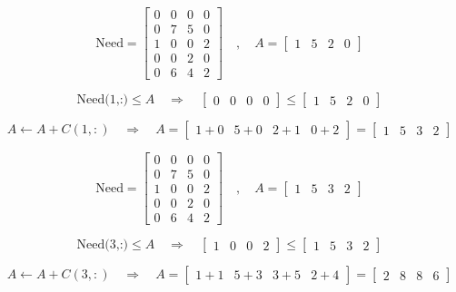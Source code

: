 \[\text{Need} = \left[\begin{matrix} 0 & 0 & 0 & 0 \\
                             0 & 7 & 5 & 0\\
                             1 & 0 & 0 & 2\\
                             0 & 0 & 2 & 0\\
                     0 & 6 & 4 & 2\end{matrix}\right]\quad,\quad
A =\left[\begin{matrix} 1 & 5  & 2 & 0   \end{matrix}\right] 
\]

\[ \text{Need(1,:)} \leq A \quad \Longrightarrow \quad
\left[\begin{matrix} 0 & 0  & 0 & 0   \end{matrix}\right] \leq
 \left[\begin{matrix} 1 & 5  & 2 & 0   \end{matrix}\right] \]

\[A \gets A + C(1,:)\quad \Longrightarrow \quad A = \left[\begin{matrix} 1+0 & 5+0  & 2+1 & 0+2  \end{matrix}\right] = 
 \left[\begin{matrix} 1 & 5  & 3 & 2  \end{matrix}\right]\]

\vspace{0.5cm}
\[\text{Need} = \left[\begin{matrix} 0 & 0 & 0 & 0 \\
                             0 & 7 & 5 & 0\\
                             1 & 0 & 0 & 2\\
                             0 & 0 & 2 & 0\\
                     0 & 6 & 4 & 2\end{matrix}\right]\quad,\quad
A =\left[\begin{matrix} 1 & 5  & 3 & 2   \end{matrix}\right] 
\]

\[ \text{Need(3,:)} \leq A \quad \Longrightarrow \quad
\left[\begin{matrix} 1 & 0  & 0 & 2   \end{matrix}\right] \leq
 \left[\begin{matrix} 1 & 5  & 3 & 2   \end{matrix}\right] \]

\[A \gets A + C(3,:)\quad \Longrightarrow \quad A = \left[\begin{matrix} 1+1 & 5+3  & 3+5 & 2+4  \end{matrix}\right] = 
 \left[\begin{matrix} 2 & 8  & 8 & 6  \end{matrix}\right]\]

